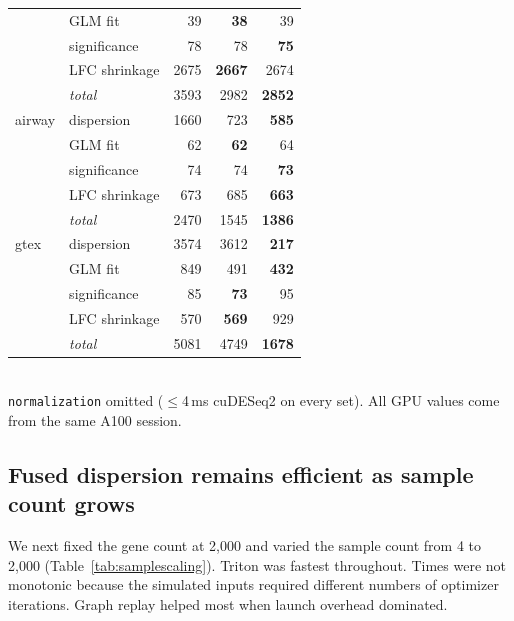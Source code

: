 \documentclass[12pt]{article}
\newcommand{\fact}[1]{#1}
\begin{document}
\begin{table}[htbp]
{\begin{tabular}{ll@{\hspace{18pt}}rrr}
        & GLM fit & 39 & \textbf{38} & 39 \\
        & significance & 78 & 78 & \textbf{75} \\
        & LFC shrinkage & 2675 & \textbf{2667} & 2674 \\
        & \emph{total} & 3593 & 2982 & \textbf{2852} \\\midrule
airway & dispersion & 1660 & 723 & \textbf{585} \\
        & GLM fit & 62 & \textbf{62} & 64 \\
        & significance & 74 & 74 & \textbf{73} \\
        & LFC shrinkage & 673 & 685 & \textbf{663} \\
        & \emph{total} & 2470 & 1545 & \textbf{1386} \\\midrule
gtex & dispersion & 3574 & 3612 & \textbf{217} \\
        & GLM fit & 849 & 491 & \textbf{432} \\
        & significance & 85 & \textbf{73} & 95 \\
        & LFC shrinkage & 570 & \textbf{569} & 929 \\
        & \emph{total} & 5081 & 4749 & \textbf{1678} \\\bottomrule
\end{tabular}}
\\[3pt]
{\footnotesize \texttt{normalization} omitted ($\le$\fact{4\,ms} cuDESeq2 on
every set). All GPU values come from the same A100 session.}
\end{table}

\subsection{Fused dispersion remains efficient as sample count grows}
We next fixed the gene count at 2{,}000 and varied the sample count from 4 to
2{,}000 (Table~\ref{tab:samplescaling}). Triton was fastest throughout. Times
were not monotonic because the simulated inputs required different numbers of
optimizer iterations. Graph replay helped most when launch overhead dominated.
\end{document}
